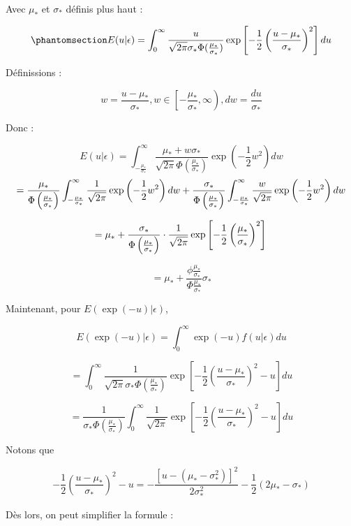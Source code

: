\documentclass[
  12pt,
]{report}
\begin{document}
Avec \(\mu_*\) et \(\sigma_*\) définis plus haut :

\begin{equation}\phantomsection\label{eq-expected-u-epsilon}{
E(u | \epsilon) =  \int_{0}^{\infty} \frac{u}{\sqrt{2 \pi}\sigma_* \Phi(\frac{\mu_*}{\sigma_*})} \exp\left[- \frac{1}{2}\left(\frac{u - \mu_*}{\sigma_*}\right)^2\right] du
}\end{equation}

Définissions :

\[
w = \frac{u - \mu_*}{\sigma_*},   w \in \left[ -\frac{\mu_*}{\sigma_*}, \infty \right), dw = \frac{du}{\sigma_*}
\]

Donc :

\[
E(u | \epsilon) =  \int_{- \frac{\mu_*}{\sigma_*}}^{\infty} \frac{\mu_* + w\sigma_*}{\sqrt{2 \pi} \Phi \left(\frac{\mu_*}{\sigma_*}\right)} \exp \left(- \frac{1}{2} w^2 \right) dw
\] \[
= \frac{\mu_*}{\Phi \left(\frac{\mu_*}{\sigma_*}\right)} \int_{- \frac{\mu_*}{\sigma_*}}^{\infty} \frac{1}{\sqrt{2 \pi}} \exp \left(- \frac{1}{2} w^2 \right)dw + \frac{\sigma_*}{\Phi \left(\frac{\mu_*}{\sigma_*} \right)} \int_{- \frac{\mu_*}{\sigma_*}}^{\infty} \frac{w}{\sqrt{2 \pi}} \exp \left(- \frac{1}{2} w^2 \right)dw\\
\]

\[
= \mu_* + \frac{\sigma_*}{\Phi \left(\frac{\mu_*}{\sigma_*} \right)} \cdot \frac{1}{\sqrt{2 \pi}} \exp \left[- \frac{1}{2} \left(\frac{\mu_*}{\sigma_*} \right)^2 \right]\\
\]

\[
= \mu_* + \frac{\phi \frac{\mu_*}{\sigma_*}}{\Phi \frac{\mu_*}{\sigma_*}} \sigma_*
\]

Maintenant, pour \(E(\exp(- u) | \epsilon)\),

\[
E(\exp(- u)| \epsilon) = \int_{0}^{\infty} \exp(-u) f(u | \epsilon) du 
\]

\[
= \int_{0}^{\infty} \frac{1}{\sqrt{2 \pi}\sigma_* \Phi(\frac{\mu_*}{\sigma_*})} \exp\left[- \frac{1}{2}\left(\frac{u - \mu_*}{\sigma_*}\right)^2 - u\right] du
\]

\[
= \frac{1}{\sigma_* \Phi(\frac{\mu_*}{\sigma_*})} \int_{0}^{\infty} \frac{1}{\sqrt{2 \pi}} \exp \left[- \frac{1}{2}\left(\frac{u - \mu_*}{\sigma_*}\right)^2 - u\right]du
\]

Notons que

\[
- \frac{1}{2}\left(\frac{u - \mu_*}{\sigma_*}\right)^2 - u = - \frac{[u - ( \mu_* - \sigma_*^2)]^2}{2 \sigma_*^2} - \frac{1}{2} (2\mu_* - \sigma_*)
\]

Dès lors, on peut simplifier la formule :
\end{document}
